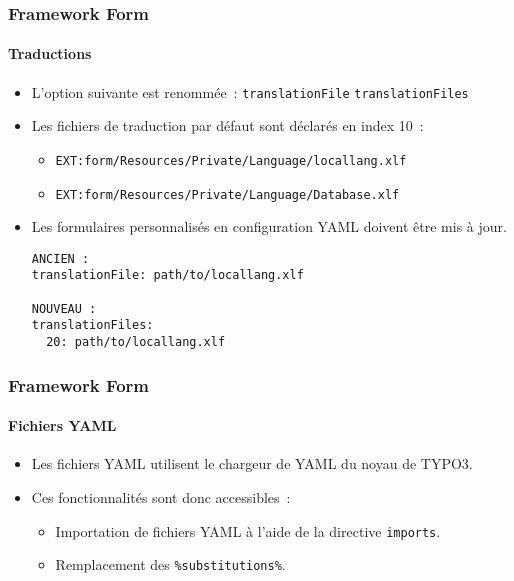 \begin{frame}[fragile]
	\frametitle{Framework Form}
	\framesubtitle{Traductions}

	\lstset{basicstyle=\tiny\ttfamily}

	\begin{itemize}
		\item L'option suivante est renommée~:\newline
			\small\texttt{translationFile} \textrightarrow\hspace{0.1cm}\texttt{translationFiles}\normalsize
		\item Les fichiers de traduction par défaut sont déclarés en index 10~:

			\begin{itemize}
				\item \texttt{EXT:form/Resources/Private/Language/locallang.xlf}
				\item \texttt{EXT:form/Resources/Private/Language/Database.xlf}
			\end{itemize}

		\item Les formulaires personnalisés en configuration YAML doivent être mis à jour.

\begin{lstlisting}
ANCIEN :
translationFile: path/to/locallang.xlf

NOUVEAU :
translationFiles:
  20: path/to/locallang.xlf
\end{lstlisting}

	\end{itemize}

\end{frame}


\begin{frame}[fragile]
	\frametitle{Framework Form}
	\framesubtitle{Fichiers YAML}

	\begin{itemize}
		\item Les fichiers YAML utilisent le chargeur de YAML du noyau de TYPO3.
		\item Ces fonctionnalités sont donc accessibles~:

			\begin{itemize}
				\item Importation de fichiers YAML à l'aide de la directive \texttt{imports}.
				\item Remplacement des \texttt{\%substitutions\%}.
			\end{itemize}

	\end{itemize}

\end{frame}

